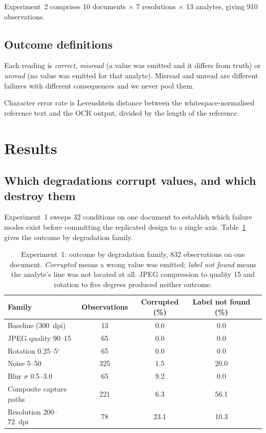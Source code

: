 \documentclass[11pt]{article}
\begin{document}
Experiment~2 comprises 10 documents $\times$ 7 resolutions $\times$ 13 analytes, giving 910
observations.

\subsection{Outcome definitions}

Each reading is \emph{correct}, \emph{misread} (a value was emitted and it differs from truth)
or \emph{unread} (no value was emitted for that analyte). Misread and unread are different
failures with different consequences and we never pool them.

Character error rate is Levenshtein distance between the whitespace-normalised reference text
and the OCR output, divided by the length of the reference.

\section{Results}

\subsection{Which degradations corrupt values, and which destroy them}

Experiment~1 sweeps 32 conditions on one document to establish which failure modes exist before
committing the replicated design to a single axis. Table~\ref{tab:families} gives the outcome by
degradation family.

\begin{table}[t]
\centering
\caption{Experiment~1: outcome by degradation family, 832 observations on one document.
\emph{Corrupted} means a wrong value was emitted; \emph{label not found} means the analyte's line
was not located at all. JPEG compression to quality 15 and rotation to five degrees produced
neither outcome.}
\label{tab:families}
\small
\begin{tabular}{lcccc}
\toprule
Family & Observations & Corrupted (\%) & Label not found (\%) \\
\midrule
Baseline (300~dpi) & 13  & \phantom{0}0.0 & \phantom{0}0.0 \\
JPEG quality 90--15 & 65  & \phantom{0}0.0 & \phantom{0}0.0 \\
Rotation 0.25--5$^\circ$ & 65  & \phantom{0}0.0 & \phantom{0}0.0 \\
Noise 5--50 & 325 & \phantom{0}1.5 & 20.0 \\
Blur $\sigma$ 0.5--3.0 & 65  & \phantom{0}9.2 & \phantom{0}0.0 \\
Composite capture paths & 221 & \phantom{0}6.3 & 56.1 \\
Resolution 200--72~dpi & 78  & 23.1 & 10.3 \\
\bottomrule
\end{tabular}
\end{table}
\end{document}
